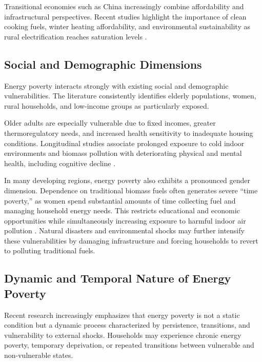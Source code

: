 \documentclass[11pt,a4paper]{article}
\begin{document}
Transitional economies such as China increasingly combine affordability and infrastructural perspectives. Recent studies highlight the importance of clean cooking fuels, winter heating affordability, and environmental sustainability as rural electrification reaches saturation levels \cite{wang2021rural,li2022transitioning}.

\subsection{Social and Demographic Dimensions}

Energy poverty interacts strongly with existing social and demographic vulnerabilities. The literature consistently identifies elderly populations, women, rural households, and low-income groups as particularly exposed.

Older adults are especially vulnerable due to fixed incomes, greater thermoregulatory needs, and increased health sensitivity to inadequate housing conditions. Longitudinal studies associate prolonged exposure to cold indoor environments and biomass pollution with deteriorating physical and mental health, including cognitive decline \cite{muller2021elderly,lee2023cognitive,chen2023aging}.

In many developing regions, energy poverty also exhibits a pronounced gender dimension. Dependence on traditional biomass fuels often generates severe ``time poverty,'' as women spend substantial amounts of time collecting fuel and managing household energy needs. This restricts educational and economic opportunities while simultaneously increasing exposure to harmful indoor air pollution \cite{kaur2021timepoverty,njoku2022gendered,rahman2023disasters}. Natural disasters and environmental shocks may further intensify these vulnerabilities by damaging infrastructure and forcing households to revert to polluting traditional fuels.

\subsection{Dynamic and Temporal Nature of Energy Poverty}

Recent research increasingly emphasizes that energy poverty is not a static condition but a dynamic process characterized by persistence, transitions, and vulnerability to external shocks. Households may experience chronic energy poverty, temporary deprivation, or repeated transitions between vulnerable and non-vulnerable states.
\end{document}
